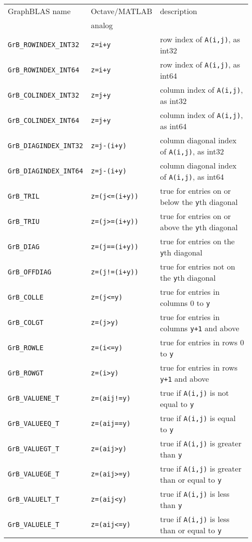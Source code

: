 \documentclass[12pt]{article}
\begin{document}
{\vspace{0.2in}
\noindent
{\footnotesize
\begin{tabular}{lll}
\hline
GraphBLAS name          & Octave/MATLAB     & description \\
                        & analog            & \\
\hline
\verb'GrB_ROWINDEX_INT32'  & \verb'z=i+y'       & row index of \verb'A(i,j)', as int32 \\
\verb'GrB_ROWINDEX_INT64'  & \verb'z=i+y'       & row index of \verb'A(i,j)', as int64 \\
\verb'GrB_COLINDEX_INT32'  & \verb'z=j+y'       & column index of \verb'A(i,j)', as int32 \\
\verb'GrB_COLINDEX_INT64'  & \verb'z=j+y'       & column index of \verb'A(i,j)', as int64 \\
\verb'GrB_DIAGINDEX_INT32' & \verb'z=j-(i+y)'   & column diagonal index of \verb'A(i,j)', as int32 \\
\verb'GrB_DIAGINDEX_INT64' & \verb'z=j-(i+y)'   & column diagonal index of \verb'A(i,j)', as int64 \\
\hline
\verb'GrB_TRIL'    & \verb'z=(j<=(i+y))'  & true for entries on or below the \verb'y'th diagonal \\
\verb'GrB_TRIU'    & \verb'z=(j>=(i+y))'  & true for entries on or above the \verb'y'th diagonal \\
\verb'GrB_DIAG'    & \verb'z=(j==(i+y))'  & true for entries on the \verb'y'th diagonal \\
\verb'GrB_OFFDIAG' & \verb'z=(j!=(i+y))'  & true for entries not on the \verb'y'th diagonal \\
\verb'GrB_COLLE'   & \verb'z=(j<=y)'      & true for entries in columns 0 to \verb'y' \\
\verb'GrB_COLGT'   & \verb'z=(j>y)'       & true for entries in columns \verb'y+1' and above \\
\verb'GrB_ROWLE'   & \verb'z=(i<=y)'      & true for entries in rows 0 to \verb'y' \\
\verb'GrB_ROWGT'   & \verb'z=(i>y)'       & true for entries in rows \verb'y+1' and above \\
\hline
\verb'GrB_VALUENE_T'     & \verb'z=(aij!=y)'    & true if \verb'A(i,j)' is not equal to \verb'y'\\
\verb'GrB_VALUEEQ_T'     & \verb'z=(aij==y)'    & true if \verb'A(i,j)' is equal to \verb'y'\\
\verb'GrB_VALUEGT_T'     & \verb'z=(aij>y)'     & true if \verb'A(i,j)' is greater than \verb'y' \\
\verb'GrB_VALUEGE_T'     & \verb'z=(aij>=y)'    & true if \verb'A(i,j)' is greater than or equal to \verb'y' \\
\verb'GrB_VALUELT_T'     & \verb'z=(aij<y)'     & true if \verb'A(i,j)' is less than \verb'y' \\
\verb'GrB_VALUELE_T'     & \verb'z=(aij<=y)'    & true if \verb'A(i,j)' is less than or equal to \verb'y' \\
%
\hline
\end{tabular}
}
\vspace{0.2in}


}
\end{document}
